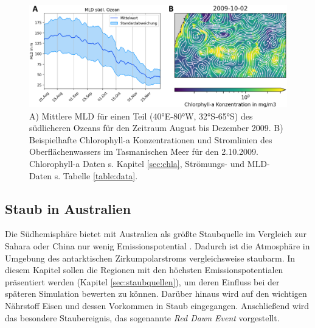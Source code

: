 \documentclass[12pt,a4paper,onecolumn]{scrartcl}
\begin{document}
\begin{figure}[!htb]
\includegraphics[width=\textwidth]{bilder/mld_currents.png}
\caption{A) Mittlere MLD für einen Teil (40°E-80°W, 32°S-65°S) des südlicheren Ozeans für den Zeitraum August bis Dezember 2009. B) Beispielhafte Chlorophyll-a Konzentrationen und Stromlinien des Oberflächenwassers im Tasmanischen Meer für den 2.10.2009. Chlorophyll-a Daten s. Kapitel \ref{sec:chla}, Strömungs- und MLD-Daten s. Tabelle \ref{table:data}.} \label{fig:mld_currents}
\end{figure}
\subsection{Staub in Australien} \label{sec:Staub}
Die Südhemisphäre bietet mit Australien als größte Staubquelle im Vergleich zur Sahara oder China nur wenig Emissionspotential \citep{Shao.2011}. Dadurch ist die Atmosphäre in Umgebung des antarktischen Zirkumpolarstroms vergleichsweise staubarm. In diesem Kapitel sollen die Regionen mit den höchsten Emissionspotentialen präsentiert werden (Kapitel \ref{sec:staubquellen}), um deren Einfluss bei der späteren Simulation bewerten zu können. Darüber hinaus wird auf den wichtigen Nährstoff Eisen und dessen Vorkommen in Staub eingegangen. Anschließend wird das besondere Staubereignis, das sogenannte \textit{Red Dawn Event} vorgestellt.
\end{document}
